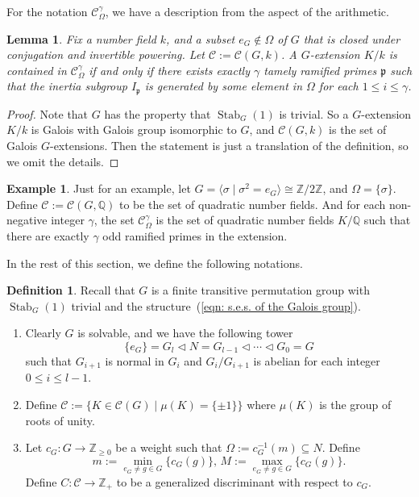 \documentclass[12pt,a4paper]{amsart}
\numberwithin{equation}{section}%
\theoremstyle{plain}%
\newtheorem{lemma}[theorem]{Lemma}%
\theoremstyle{definition}%
\newtheorem{definition}[theorem]{Definition}%
\newtheorem{example}[theorem]{Example}%
\theoremstyle{remark}%
\begin{document}
    For the notation $\mathcal{C}_{\Omega}^{\gamma}$, we have a description from the aspect of the arithmetic.
    \begin{lemma}
    	Fix a number field $k$, and a subset $e_{G}\notin\Omega$ of $G$ that is closed under conjugation and invertible powering.
    	Let $\mathcal{C}:=\mathcal{C}(G,k)$.
    	A $G$-extension $K/k$ is contained in $\mathcal{C}_{\Omega}^{\gamma}$ if and only if there exists exactly $\gamma$ tamely ramified primes $\mathfrak{p}$ such that the inertia subgroup $I_{\mathfrak{p}}$ is generated by some element in $\Omega$ for each $1\leq i\leq\gamma$.
    \end{lemma}
    \begin{proof}
    	Note that $G$ has the property that $\operatorname{Stab}_{G}(1)$ is trivial.
    	So a $G$-extension $K/k$ is Galois with Galois group isomorphic to $G$, and $\mathcal{C}(G,k)$ is the set of Galois $G$-extensions.
    	Then the statement is just a translation of the definition, so we omit the details.
    \end{proof}	
    \begin{example}
    	Just for an example, let $G=\langle\sigma\mid\sigma^{2}=e_{G}\rangle\cong\mathbb{Z}/2\mathbb{Z}$, and $\Omega=\{\sigma\}$.
    	Define $\mathcal{C}:=\mathcal{C}(G,\mathbb{Q})$ to be the set of quadratic number fields.
    	And for each non-negative integer $\gamma$, the set $\mathcal{C}_{\Omega}^{\gamma}$ is the set of quadratic number fields $K/\mathbb{Q}$ such that there are exactly $\gamma$ odd ramified primes in the extension.
    \end{example}
    In the rest of this section, we define the following notations.
    \begin{definition}\label{def: notations of S5}
    	Recall that $G$ is a finite transitive permutation group with $\operatorname{Stab}_{G}(1)$ trivial and the structure~(\ref{eqn: s.e.s. of the Galois group}).
    	\begin{enumerate}
    		\item Clearly $G$ is solvable, and we have the following tower
    		\begin{equation*}
    			\{e_G\}=G_{l}\triangleleft N=G_{l-1}\triangleleft\cdots\triangleleft G_{0}=G
    		\end{equation*}
    		such that $G_{i+1}$ is normal in $G_i$ and $G_i/G_{i+1}$ is abelian for each integer $0\leq i\leq l-1$.
    		\item Define $\mathcal{C}:=\{K\in\mathcal{C}(G)\mid\mu(K)=\{\pm1\}\}$ where $\mu(K)$ is the group of roots of unity.
    		\item Let $c_G:G\to\mathbb{Z}_{\geq0}$ be a weight such that $\Omega:=c_{G}^{-1}(m)\subseteq N$.
    		Define
    		\begin{equation*}
    			m:=\min_{e_G\neq g\in G}\{c_G(g)\},\, M:=\max_{e_G\neq g\in G}\{c_G(g)\}.
    		\end{equation*}
    		Define $C:\mathcal{C}\to\mathbb{Z}_+$ to be a generalized discriminant with respect to $c_G$.
    	\end{enumerate}    	
    \end{definition}
\end{document}
